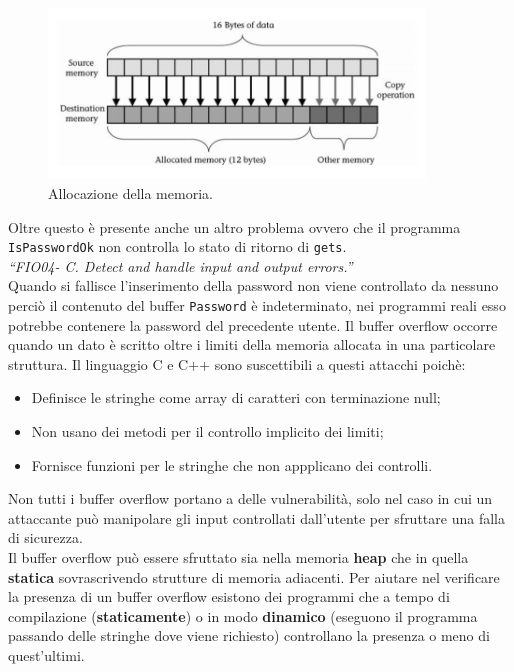 \begin{figure}[H]
    \centering
    \includegraphics[width=10cm, keepaspectratio]{capitoli/secure_coding/img/cap_2/memory.png}
    \caption{Allocazione della memoria.}\label{fig:memoria}
\end{figure}
Oltre questo è presente anche un altro problema ovvero che il programma \verb|IsPasswordOk| non controlla lo stato di ritorno di \verb|gets|. \\
\textit{“FIO04- C. Detect and handle input and output errors.”}\\
Quando si fallisce l'inserimento della password non viene controllato da nessuno perciò il contenuto del buffer \verb|Password| è indeterminato, nei programmi reali esso potrebbe contenere la password del precedente utente.
Il buffer overflow occorre quando un dato è scritto oltre i limiti della memoria allocata in una particolare struttura. Il linguaggio C e C++ sono suscettibili a questi attacchi poichè:
\begin{itemize}
    \item Definisce le stringhe come array di caratteri con terminazione null;
    \item Non usano dei metodi per il controllo implicito dei limiti;
    \item Fornisce funzioni per le stringhe che non appplicano dei controlli.
\end{itemize}
Non tutti i buffer overflow portano a delle vulnerabilità, solo nel caso in cui un attaccante può manipolare gli input controllati dall'utente per sfruttare una falla di sicurezza.\\
Il buffer overflow può essere sfruttato sia nella memoria \textbf{heap} che in quella \textbf{statica} sovrascrivendo strutture di memoria adiacenti. Per aiutare nel verificare la presenza di un buffer overflow esistono dei programmi che a tempo di compilazione (\textbf{staticamente}) o in modo \textbf{dinamico} (eseguono il programma passando delle stringhe dove viene richiesto) controllano la presenza o meno di quest'ultimi.

